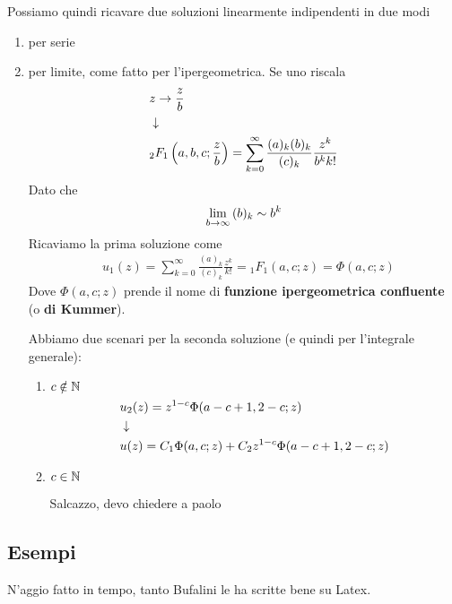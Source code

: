 Possiamo quindi ricavare due soluzioni linearmente indipendenti in due modi
\begin{enumerate}
	\item per serie
	\item per limite, come fatto per l'ipergeometrica. Se uno riscala
	\begin{align}
		&z \to \frac{z}{b} \\ &\downarrow \nonumber \\
		&{}_2F_1 \left( a,b,c; \frac{z}{b} \right) = \sum_{k=0}^{\infty} \frac{(a)_k(b)_k}{(c)_k}\frac{z^k}{b^kk!}
	\end{align}
	Dato che
	\begin{align}
		\underset{b \rightarrow \infty}{\lim} \, (b)_k \sim b^k
	\end{align}
	Ricaviamo la prima soluzione come
	\begin{align}
		&u_1(z) = \sum_{k=0}^{\infty} \frac{(a)_k}{(c)_k}\frac{z^k}{k!} = {}_1F_1(a,c;z) = \Phi(a,c;z)
	\end{align}
	Dove $\Phi(a,c;z)$ prende il nome di \textbf{funzione ipergeometrica confluente} (o\textbf{ di Kummer}).
	
	\newpage
	
	Abbiamo due scenari per la seconda soluzione (e quindi per l'integrale generale):
	\begin{enumerate}
		\item $c \notin \mathbb{N}$
		\begin{align}
			&u_2(z) = z^{1-c}\Phi(a-c+1, 2-c;z) \\ &\downarrow \nonumber \\
			&u(z) = C_1\Phi(a,c;z) + C_2 z^{1-c}\Phi(a-c+1, 2-c;z)
		\end{align}
		\item $c \in \mathbb{N}$
		
		Salcazzo, devo chiedere a paolo
	\end{enumerate}
\end{enumerate}

\newpage
\subsection{Esempi}
N'aggio fatto in tempo, tanto Bufalini le ha scritte bene su Latex.